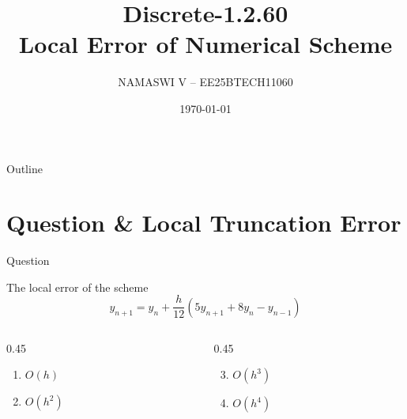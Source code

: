 \documentclass{beamer}
\title{Discrete-1.2.60\\Local Error of Numerical Scheme}
\author{NAMASWI V -- EE25BTECH11060}
\date{\today}
\begin{document}
\begin{frame}
    \titlepage
\end{frame}

\begin{frame}{Outline}
    \tableofcontents
\end{frame}

\section{Question \& Local Truncation Error}

\begin{frame}{Question}

The local error of the scheme
\begin{equation}
    y_{n+1} = y_n + \frac{h}{12}\left(5y_{n+1} + 8y_n - y_{n-1}\right)
\end{equation}

\vspace{0.4cm}

\begin{columns}[t]
    \begin{column}{0.45\textwidth}
        \begin{enumerate}[label=\alph*)]
            \item $O(h)$
            \item $O(h^2)$
        \end{enumerate}
    \end{column}
    \begin{column}{0.45\textwidth}
        \begin{enumerate}[label=\alph*)]
            \setcounter{enumi}{2}
            \item $O(h^3)$
            \item \textbf{$O(h^4)$} \quad \checkmark
        \end{enumerate}
    \end{column}
\end{columns}

\end{frame}
\end{document}
